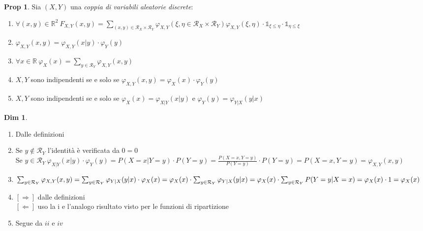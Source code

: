 \documentclass[12pt, a4paper]{report}
\theoremstyle{definition}
\newtheorem*{demonstration}{Dim}
\newtheorem*{proposition}{Prop}
\DeclareRobustCommand{\R}{\mathbb{R}}%
\DeclareRobustCommand{\supp}{\mathcal{R}}%
\DeclareRobustCommand{\one}{\mathds{1}}
\begin{document}
\begin{proposition}
	Sia $(X,Y)$ una \emph{coppia di variabili aleatorie discrete}:
	\begin{enumerate}[label=(\roman*)]
		\item \(\forall(x,y)\in\R^2\ F_{X,Y}(x,y)=\sum_{(x,y)\in\supp_X\times
		\supp_Y}\varphi_{X,Y}(\xi,\eta\in\supp_X\times\supp_Y)\varphi_{X,Y}(\xi,\eta)
		\cdot \one_{\xi\leq\eta}\cdot \one_{\eta\leq\xi}\)
		\item \(\varphi_{X,Y}(x,y)=\varphi_{X,Y}(x|y)\cdot \varphi_Y(y)\)
		\item \(\forall x\in\R\ \varphi_X(x)=\sum_{y\in\supp_Y}\varphi_{X,Y}(x,y)\)
		\item $X,Y$ sono indipendenti se e solo se \(\varphi_{X,Y}(x,y)=
		\varphi_X(x)\cdot \varphi_Y(y)\)
		\item $X,Y$ sono indipendenti se e solo se \(\varphi_X(x)=\varphi_{X|Y}
		(x|y)\) e \(\varphi_Y(y)=\varphi_{Y|X}(y|x)\)
	\end{enumerate}
\end{proposition}
\begin{demonstration}
	\mbox{}
	\begin{enumerate}[label=(\roman*)]
		\item Dalle definizioni
		\item Se \(y\notin\supp_Y\) l'identità è verificata da $0=0$\\
		Se \(y\in\supp_Y\ \varphi_{X|Y}(x|y)\cdot \varphi_Y(y)=P(X=x|Y=y)\cdot P(Y=y)=
		\frac{P(X=x,Y=y)}{P(Y=y)}\cdot P(Y=y)=P(X=x,Y=y)=\varphi_{X,Y}(x,y)\)
		\item \(\sum_{y\in\supp_Y}\varphi_{X,Y}(x,y)=\sum_{y\in\supp_Y}\varphi_
		{Y|X}(y|x)\cdot \varphi_X(x)=\varphi_X(x)\cdot \sum_{y\in\supp_Y}\varphi_{Y|X}(y|x)
		=\\\varphi_X(x)\cdot \sum_{y\in\supp_Y}P(Y=y|X=x)=\varphi_X(x)\cdot 1=\varphi_X(x)\)
		\item $[\Rightarrow]$ dalle definizioni\\
		$[\Leftarrow]$ uso la i e l'analogo risultato visto per le funzioni di
		ripartizione
		\item Segue da $ii$ e $iv$
	\end{enumerate}
\end{demonstration}
\end{document}
